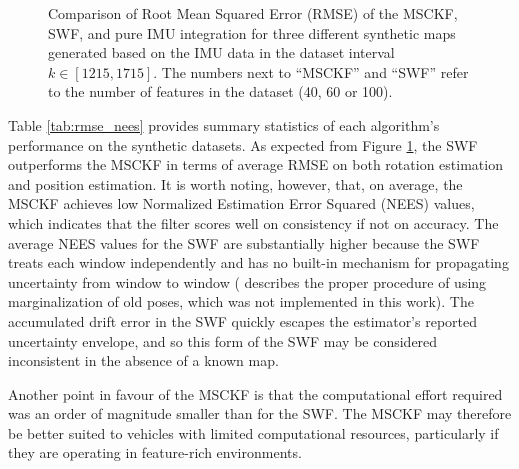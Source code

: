 \documentclass[letterpaper, 10 pt, conference]{ieeeconf}  %
\begin{document}
\begin{figure}
    \centering


    \caption{Comparison of Root Mean Squared Error (RMSE) of the MSCKF, SWF, and pure IMU integration for three different synthetic maps generated based on the IMU data in the dataset interval $k\in[1215,1715]$. The numbers next to ``MSCKF'' and ``SWF'' refer to the number of features in the dataset (40, 60 or 100).}
    \label{fig:comp_3}
\end{figure}

Table \ref{tab:rmse_nees} provides summary statistics of each algorithm's performance on the synthetic datasets.
As expected from Figure \ref{fig:comp_3}, the SWF outperforms the MSCKF in terms of average RMSE on both rotation estimation and position estimation.
It is worth noting, however, that, on average, the MSCKF achieves low Normalized Estimation Error Squared (NEES) values, which indicates that the filter scores well on consistency if not on accuracy.
The average NEES values for the SWF are substantially higher because the SWF treats each window independently and has no built-in mechanism for propagating uncertainty from window to window (\cite{Sibley:2010:JFR} describes the proper procedure of using marginalization of old poses, which was not implemented in this work).
The accumulated drift error in the SWF quickly escapes the estimator's reported uncertainty envelope, and so this form of the SWF may be considered inconsistent in the absence of a known map.

Another point in favour of the MSCKF is that the computational effort required was an order of magnitude smaller than for the SWF.
The MSCKF may therefore be better suited to vehicles with limited computational resources, particularly if they are operating in feature-rich environments.
\end{document}
